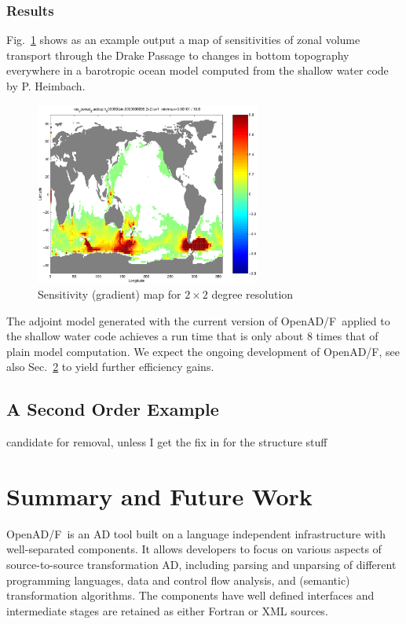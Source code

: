 \documentclass{book}
\newcommand{\OpenADF}{OpenAD/F}
\newcommand{\refsec}[1]{{Sec.~\ref{#1}}}
\newcommand{\reffig}[1]{{Fig.~\ref{#1}}}
\begin{document}
\subsection{Results}
\reffig{fig:sensMap} shows as an example output a map of sensitivities of 
zonal volume transport through the Drake Passage 
to changes in bottom topography everywhere in a barotropic ocean model 
computed from the shallow water code by P. Heimbach.
\begin{figure}
\begin{center}
\includegraphics[height=6cm]{sensMap}
\end{center}
\caption{Sensitivity (gradient) map for $2\times 2$ degree resolution}\label{fig:sensMap}
\end{figure} 
The adjoint model generated with the current version of \OpenADF\ applied to the 
shallow water code achieves 
a run time that is only about 8 times that of  plain model computation.
We expect the ongoing development of \OpenADF, see also \refsec{chap:concl} to yield 
further efficiency gains.

\section{A Second Order Example}

{\color{red} candidate for removal, unless I get the fix in for the structure stuff}

\chapter{Summary and Future Work}\label{chap:concl}

\OpenADF\ is an AD tool built on a language independent infrastructure with 
well-separated components. 
It 
allows developers to focus on various aspects of source-to-source 
transformation AD, including parsing and unparsing of different programming
languages, data and control flow analysis, and (semantic) transformation 
algorithms.
The components have well defined interfaces and intermediate stages 
are retained as either Fortran or XML sources. 
 
\end{document}
